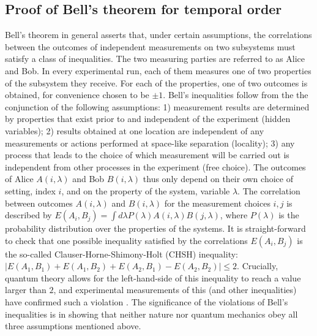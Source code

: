 \documentclass[a4paper,11pt]{article}
\newcommand{\blue}[1]{\textcolor{blue}{#1}}
\begin{document}
\subsection*{Proof of Bell's theorem for temporal order}\label{proof}

{Bell's theorem {in general} asserts that, under certain assumptions,  {the correlations between the} outcomes of independent measurements on two subsystems {must} satisfy a class of inequalities. The two measuring {parties} are referred to as Alice and Bob. {In every experimental run}, each of them measures one of two properties of the subsystem {they receive. For each of the properties, one of two outcomes is obtained, for convenience chosen to be $\pm 1$}.
{Bell's inequalities follow from the the conjunction of the following assumptions: }
1) measurement results are determined by properties that exist prior to and independent of the experiment (hidden variables); 2) results obtained at one location are independent of any measurements or actions performed at space-like separation (locality); 3) any process that leads to the choice {of} which measurement will be carried out is independent from other processes in the experiment (free choice). The outcomes of Alice $A(i, \lambda)$ and Bob $B(i, \lambda)$  thus only depend on their own choice of setting, index $i$,  and on the property of the system, variable $\lambda$. The correlation between outcomes $A(i, \lambda)$ and $B(i, \lambda)$ for the measurement choices $i,j$ is described by $E(A_i,B_j) = \int d\lambda P(\lambda) A(i,\lambda)B(j,\lambda)$, where $P(\lambda)$ is the probability distribution over the properties of the systems.
It is straight-forward to check that {one possible} inequality satisfied by the correlations $E(A_i, B_j)$ is the so-called Clauser-Horne-Shimony-Holt (CHSH) inequality: $|E(A_1,B_1) + E(A_1,B_2) + E(A_2,B_1)-E(A_2,B_2)|\leq 2$. %
{Crucially, quantum theory allows for the left-hand-side of this inequality to reach a value larger than $2$, and experimental measurements of this (and other inequalities) have confirmed such a violation \cite{Clauser:1972, hensen2015experimental, Giustina2015, Shalm2015}.}
The significance of the violations of  Bell's inequalities is in showing that neither nature nor quantum mechanics obey all three assumptions mentioned above. }
\end{document}

